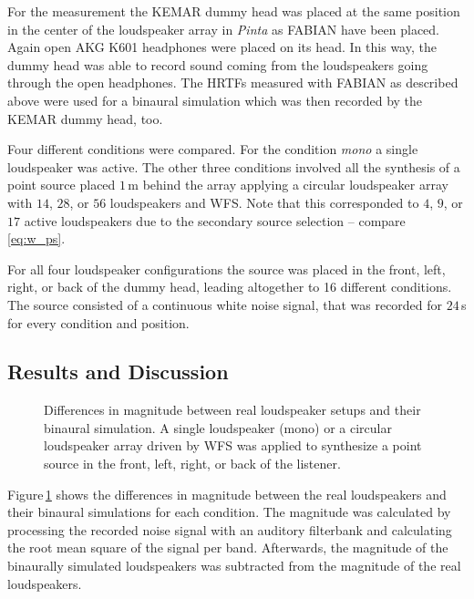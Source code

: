 For the measurement the {\small KEMAR} dummy head was placed at the same
position in the center of the loudspeaker array in \emph{Pinta} as {\small
FABIAN} have been placed. Again open
{\small AKG K601} headphones were placed on its head. In this way,
the dummy head was able to
record sound coming from the loudspeakers going through the open headphones.
The \acp{HRTF} measured with {\small FABIAN} as described above were
used for a binaural simulation
which was then recorded by the {\small KEMAR} dummy head, too.

Four different conditions were compared. For the condition
\emph{mono} a single loudspeaker was active. The other three conditions involved
all the synthesis of a point source placed $1$\,m behind the array applying a
circular loudspeaker array with $14$, $28$, or $56$ loudspeakers and \ac{WFS}.
Note that
this corresponded to $4$, $9$, or $17$ active loudspeakers due to the secondary
source selection -- compare \eqref{eq:w_ps}.

For all four loudspeaker configurations the source was placed in the front, left,
right, or back of the dummy head, leading altogether to 16 different conditions.
The source consisted of a continuous white noise signal, that was
recorded for $24$\,s for every condition and position.


\subsection{Results and Discussion}
%
\begin{figure}
    \small
    \centering
    
    \caption{Differences in magnitude between real loudspeaker setups and their binaural simulation.
    A single loudspeaker (mono) or a circular loudspeaker array driven by
    \ac{WFS}
    was applied to synthesize a point source in the front, left, right, or back
    of the listener.
    }
    \label{fig:pinta_recordings}
\end{figure}
%
Figure\,\ref{fig:pinta_recordings} shows the differences in magnitude between
the real loudspeakers and their binaural simulations for each condition.
The magnitude was calculated by processing the recorded noise signal with an
auditory filterbank and calculating the root mean square of the signal per band.
Afterwards, the
magnitude of the binaurally simulated loudspeakers was subtracted from the
magnitude of the real loudspeakers.


